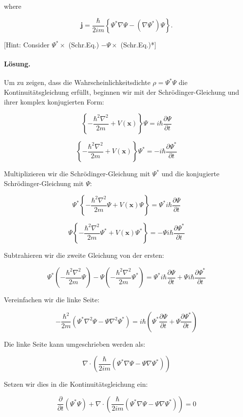 \documentclass[11pt,a4paper]{article}
\begin{document}
where

$$
\mathbf{j}=\frac{\hbar}{2 i m}\left\{\Psi^* \nabla \Psi-\left(\nabla \Psi^*\right) \Psi\right\} .
$$

[Hint: Consider $\Psi^* \times$ (Schr.Eq.) $-\Psi \times$ (Schr.Eq.)*]

\paragraph{Lösung.}
Um zu zeigen, dass die Wahrscheinlichkeitsdichte \(\rho = \Psi^* \Psi\) die Kontinuitätsgleichung erfüllt, beginnen wir mit der Schrödinger-Gleichung und ihrer komplex konjugierten Form:

\[
\left\{-\frac{\hbar^2 \nabla^2}{2 m} + V(\mathbf{x})\right\} \Psi = i \hbar \frac{\partial \Psi}{\partial t}
\]

\[
\left\{-\frac{\hbar^2 \nabla^2}{2 m} + V(\mathbf{x})\right\} \Psi^* = -i \hbar \frac{\partial \Psi^*}{\partial t}
\]

Multiplizieren wir die Schrödinger-Gleichung mit \(\Psi^*\) und die konjugierte Schrödinger-Gleichung mit \(\Psi\):

\[
\Psi^* \left\{-\frac{\hbar^2 \nabla^2}{2 m} \Psi + V(\mathbf{x}) \Psi\right\} = \Psi^* i \hbar \frac{\partial \Psi}{\partial t}
\]

\[
\Psi \left\{-\frac{\hbar^2 \nabla^2}{2 m} \Psi^* + V(\mathbf{x}) \Psi^*\right\} = -\Psi i \hbar \frac{\partial \Psi^*}{\partial t}
\]

Subtrahieren wir die zweite Gleichung von der ersten:

\[
\Psi^* \left(-\frac{\hbar^2 \nabla^2}{2 m} \Psi\right) - \Psi \left(-\frac{\hbar^2 \nabla^2}{2 m} \Psi^*\right) = \Psi^* i \hbar \frac{\partial \Psi}{\partial t} + \Psi i \hbar \frac{\partial \Psi^*}{\partial t}
\]

Vereinfachen wir die linke Seite:

\[
-\frac{\hbar^2}{2 m} \left(\Psi^* \nabla^2 \Psi - \Psi \nabla^2 \Psi^*\right) = i \hbar \left(\Psi^* \frac{\partial \Psi}{\partial t} + \Psi \frac{\partial \Psi^*}{\partial t}\right)
\]

Die linke Seite kann umgeschrieben werden als:

\[
\nabla \cdot \left(\frac{\hbar}{2 i m} \left(\Psi^* \nabla \Psi - \Psi \nabla \Psi^*\right)\right)
\]

Setzen wir dies in die Kontinuitätsgleichung ein:

\[
\frac{\partial}{\partial t} (\Psi^* \Psi) + \nabla \cdot \left(\frac{\hbar}{2 i m} \left(\Psi^* \nabla \Psi - \Psi \nabla \Psi^*\right)\right) = 0
\]
\end{document}
